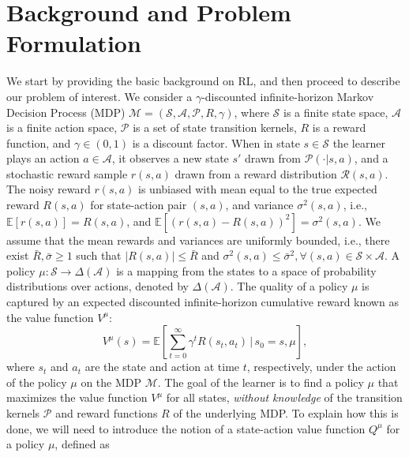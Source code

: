 \documentclass{article}
\newcommand{\mc}{\mathcal}
\begin{document}
\section{Background and Problem Formulation} \label{sec:Problem Formulation}
We start by providing the basic background on RL, and then proceed to describe our problem of interest. We consider a $\gamma$-discounted infinite-horizon Markov Decision Process (MDP) $\mathcal{M} = \left( \mathcal{S}, \mathcal{A}, \mathcal{P}, R, \gamma \right)$, where $\mathcal{S}$ is a finite state space, $\mathcal{A}$ is a finite action space, $\mathcal{P}$ is a set of state transition kernels, $R$ is a reward function, and $\gamma \in (0,1)$ is a discount factor. When in state $s \in \mc{S}$ the learner plays an action $a \in \mc{A}$, it observes a new state $s'$ drawn from $\mc{P}(\cdot | s, a)$, and a stochastic reward sample $r(s,a)$ drawn from a reward distribution $\mc{R}(s,a)$. The noisy reward $r(s,a)$ is unbiased with mean equal to the true expected reward $R(s,a)$ for state-action pair $(s,a)$, and variance $\sigma^2(s,a)$, i.e., $\mathbb{E}[r(s,a)]=R(s,a)$, and $\mathbb{E}[(r(s,a)-R(s,a))^2] = \sigma^2(s,a)$. We assume that the mean rewards and variances are uniformly bounded, i.e., there exist $\bar{R}, \bar{\sigma} \geq 1$ such that $|R(s,a)| \leq \bar{R}$ and $\sigma^2(s,a) \leq \bar{\sigma}^2, \forall (s,a) \in \mc{S} \times \mc{A}.$ A policy $\mu: \mc{S} \rightarrow \Delta(\mc{A})$ is a mapping from the states to a space of probability distributions over actions, denoted by $\Delta(\mc{A})$. The quality of a policy $\mu$ is captured by an expected discounted infinite-horizon cumulative reward known as the value function $V^{\mu}$: 
\begin{equation}
    V^\mu(s) = \mathbb{E}\left[ \sum_{t=0}^\infty \gamma^t R(s_t, a_t) \,\bigg|\, s_0 = s, \mu \right],
\end{equation}
where $s_t$ and $a_t$ are the state and action at time $t$, respectively, under the action of the policy $\mu$ on the MDP $\mc{M}$. The goal of the learner is to find a policy $\mu$ that maximizes the value function $V^\mu$ for all states, \emph{without knowledge} of the transition kernels $\mc{P}$ and reward functions $R$ of the underlying MDP. To explain how this is done, we will need to introduce the notion of a state-action value function $Q^\mu $ for a policy $\mu$, defined as
\end{document}

